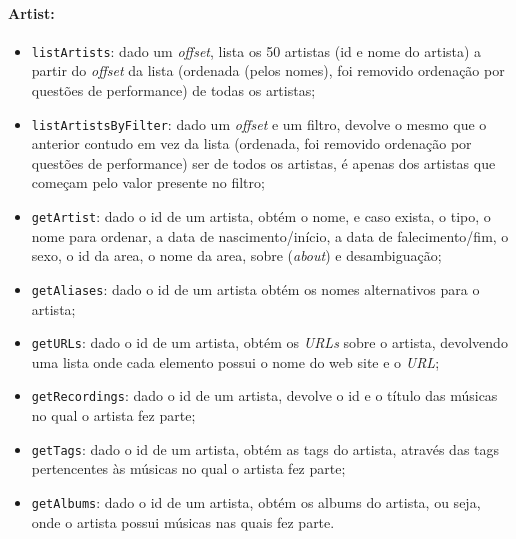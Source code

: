 \documentclass{article}
\begin{document}
\paragraph{\textbf{Artist:}}
    \begin{itemize}
        \item \texttt{listArtists}: dado um \textit{offset}, lista os 50 artistas (id e nome do artista) a partir do \textit{offset} da lista (ordenada (pelos nomes), foi removido ordenação por questões de performance) de todas os artistas;
        \item \texttt{listArtistsByFilter}: dado um \textit{offset} e um filtro, devolve o mesmo que o anterior contudo em vez da lista (ordenada, foi removido ordenação por questões de performance) ser de todos os artistas, é apenas dos artistas que começam pelo valor presente no filtro;
        \item \texttt{getArtist}: dado o id de um artista, obtém o nome, e caso exista, o tipo, o nome para ordenar, a data de nascimento/início, a data de falecimento/fim, o sexo, o id da area, o nome da area, sobre (\textit{about}) e desambiguação;
        \item \texttt{getAliases}: dado o id de um artista obtém os nomes alternativos para o artista;
        \item \texttt{getURLs}: dado o id de um artista, obtém os \textit{URLs} sobre o artista, devolvendo uma lista onde cada elemento possui o nome do web site e o \textit{URL};
        \item \texttt{getRecordings}: dado o id de um artista, devolve o id e o título das músicas no qual o artista fez parte;
        \item \texttt{getTags}: dado o id de um artista, obtém as tags do artista, através das tags pertencentes às músicas no qual o artista fez parte;
        \item \texttt{getAlbums}: dado o id de um artista, obtém os albums do artista, ou seja, onde o artista possui músicas nas quais fez parte.
    \end{itemize}
\end{document}
